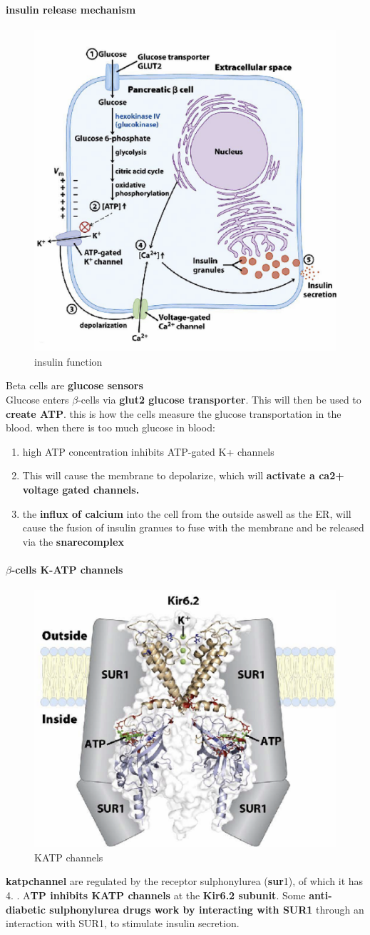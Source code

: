 \documentclass[../main.tex]{subfiles}
\begin{document}
\paragraph{insulin release mechanism}
\begin{figure}[H]
    \centering
    \includegraphics[width=0.5\linewidth]{betaCells.png}
    \caption{insulin function}
    \label{fig:enter-label}
\end{figure}
Beta cells are \textbf{glucose sensors}\\
Glucose enters $\beta$-cells via \textbf{glut2 glucose transporter}. This will then be used to \textbf{create ATP}. this is how the cells measure the glucose transportation in the blood. when there is too much glucose in blood:
\begin{enumerate}
    \item high ATP concentration inhibits ATP-gated K+ channels
    \item This will cause the membrane to depolarize, which will\textbf{ activate a ca2+ voltage gated channels. }
    \item the \textbf{influx of calcium} into the cell from the outside aswell as the ER, will cause the fusion of insulin granues to fuse with the membrane and be released via the \textbf{\gls{snarecomplex}}
\end{enumerate}
\paragraph{$\beta$-cells K-ATP channels}
\begin{figure}[H]
    \centering
    \includegraphics[width=0.5\linewidth]{KATPCHannel.png}
    \caption{KATP channels}
    \label{fig:enter-label}
\end{figure}
\textbf{\gls{katpchannel}} are regulated by the receptor sulphonylurea (\textbf{\gls{sur}}1), of which it has 4. . A\textbf{TP inhibits KATP channels} at the \textbf{Kir6.2 subunit}. Some \textbf{anti-diabetic sulphonylurea drugs work by interacting with SUR1 }
through an interaction with SUR1, to stimulate insulin secretion.
\end{document}
